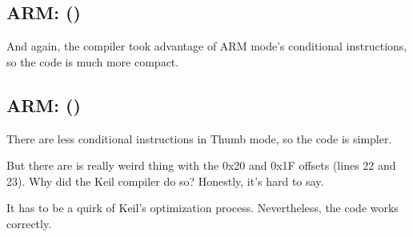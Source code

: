 ﻿\subsection{ARM: \OptimizingKeilVI (\ARMMode)}

And again, the compiler took advantage of ARM mode's conditional instructions, 
so the code is much more compact.



\subsection{ARM: \OptimizingKeilVI (\ThumbMode)}
\myindex{\CompilerAnomaly}
\label{Keil_anomaly}

There are less conditional instructions in Thumb mode, so the code is simpler.

But there are is really weird thing with the 0x20 and 0x1F offsets (lines 22 and 23).
Why did the Keil compiler do so?
Honestly, it's hard to say.

It has to be a quirk of Keil's optimization process.
Nevertheless, the code works correctly.



